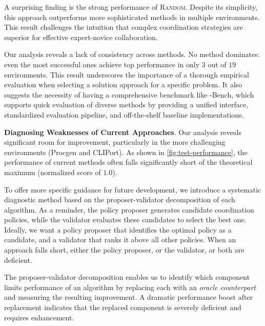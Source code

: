 A surprising finding is the strong performance of \textsc{Random}. Despite its simplicity, this approach outperforms more sophisticated methods in multiple environments. This result challenges the intuition that complex coordination strategies are superior for effective expert-novice collaboration.

Our analysis reveals a lack of consistency across methods. No method dominates: even the most successful ones achieve top performance in only $3$ out of $19$ environments. 
This result underscores the importance of a thorough empirical evaluation when selecting a solution approach for a specific \ourMethod problem.
It also suggests the necessity of having a comprehensive benchmark like \ourMethod-Bench, which supports quick evaluation of diverse methods by providing a unified interface, standardized evaluation pipeline, and off-the-shelf baseline implementations. 



\textbf{Diagnosing Weaknesses of Current Approaches}.
Our analysis reveals significant room for improvement, particularly in the more challenging environments (Procgen and CLIPort). As shown in \autoref{fig:test-performance}, the performance of current methods often falls significantly short of the theoretical maximum (normalized score of $1.0$).

To offer more specific guidance for future development, we introduce a systematic diagnostic method based on the proposer-validator decomposition of each algorithm. 
As a reminder, the policy proposer generates candidate coordination policies, while the validator evaluates these candidates to select the best one. 
Ideally, we want a policy proposer that identifies the optimal policy as a candidate, and a validator that ranks it above all other policies.
When an approach falls short, either the policy proposer, or the validator, or both are deficient.

The proposer-validator decomposition enables us to identify which component limits performance of an algorithm by replacing each with an \textit{oracle counterpart} and measuring the resulting improvement. A dramatic performance boost after replacement indicates that the replaced component is severely deficient and requires enhancement.

